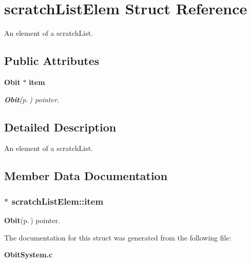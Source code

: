\section{scratch\-List\-Elem Struct Reference}
\label{structscratchListElem}
An element of a scratch\-List.  


\subsection*{Public Attributes}
\begin{CompactItemize}
\item 
{\bf Obit} $\ast$ {\bf item}
\begin{CompactList}\small\item\em {\bf Obit}{\rm (p.\,\pageref{structObit})} pointer. \item\end{CompactList}\end{CompactItemize}


\subsection{Detailed Description}
An element of a scratch\-List. 



\subsection{Member Data Documentation}
\subsubsection{$\ast$ {\bf scratch\-List\-Elem::item}}\label{structscratchListElem_o0}


{\bf Obit}{\rm (p.\,\pageref{structObit})} pointer. 



The documentation for this struct was generated from the following file:\begin{CompactItemize}
\item 
{\bf Obit\-System.c}\end{CompactItemize}
